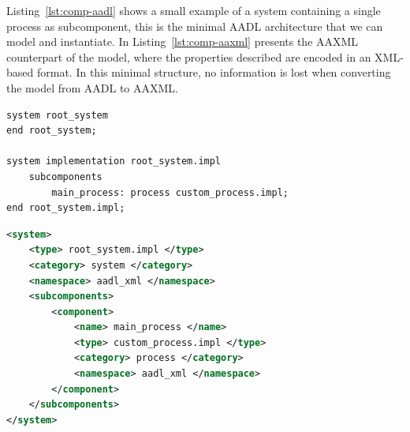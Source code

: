 Listing~\ref{lst:comp-aadl} shows a small example of a system containing a single process as subcomponent, this is the minimal AADL architecture that we can model and instantiate. In Listing~\ref{lst:comp-aaxml} presents the AAXML counterpart of the model, where the properties described are encoded in an XML-based format. In this minimal structure, no information is lost when converting the model from AADL to AAXML.

\bigskip

\begin{lstlisting}[language=AADL,caption={Minimal AADL model},label=lst:comp-aadl]
system root_system
end root_system;

system implementation root_system.impl
	subcomponents
		main_process: process custom_process.impl;
end root_system.impl;
\end{lstlisting}

\begin{lstlisting}[language=XML,caption={AAXML representation of the minimal AADL model},label=lst:comp-aaxml]
<system>
	<type> root_system.impl </type>
	<category> system </category>
	<namespace> aadl_xml </namespace>
	<subcomponents>
		<component>
			<name> main_process </name>
			<type> custom_process.impl </type>
			<category> process </category>
			<namespace> aadl_xml </namespace>
		</component>
	</subcomponents>
</system>
\end{lstlisting}

